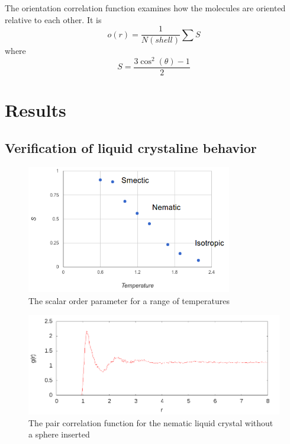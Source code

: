 \documentclass[preprint, aps]{revtex4-1}
\begin{document}
The orientation correlation function examines how the molecules are oriented
relative to each other. It is
	\begin{equation}
		o(r) = \frac{1}{N(shell)}\sum S
	\end{equation}
where
	\begin{equation}
		S = \frac{3\cos^2(\theta)-1}{2}
	\end{equation}
		


\section*{Results}

\subsection*{Verification of liquid crystaline behavior}
	\begin{figure}
		\includegraphics[width=0.8\textwidth]{phase.png}
		\caption{The scalar order parameter for a range of temperatures}
		\label{fig:phase}
	\end{figure}
	\begin{figure}
		\includegraphics[width=\textwidth]{pcf.png}
		\caption{The pair correlation function for the nematic liquid crystal
		without a sphere inserted}
		\label{fig:pcf}
	\end{figure}
\end{document}
